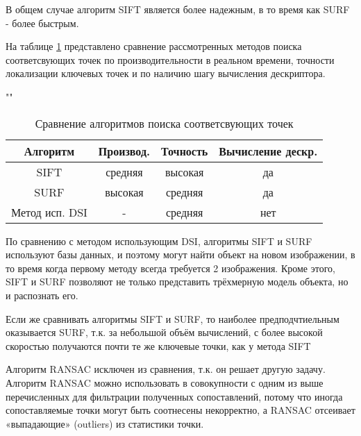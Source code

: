 В общем случае алгоритм SIFT является более надежным, в то время как SURF - более быстрым.

На таблице \ref{tab} представлено сравнение рассмотренных методов поиска соответсвующих точек по производительности в реальном времени, точности локализации ключевых точек и по наличию шагу вычисления дескриптора.

\begin{table}[H]
	\begin{center}
		\caption{Сравнение алгоритмов поиска соответсвующих точек}
		\label{tab}
		""\newline
		\begin{tabular}{ | c | c | c | c | }
			\hline
			Алгоритм & Производ.  & Точность & Вычисление дескр. \\ \hline
			SIFT & средняя & высокая & да \\ \hline
			SURF & высокая & средняя & да \\ \hline
			Метод исп. DSI & - & средняя & нет \\ \hline
		\end{tabular}
	\end{center}
\end{table}

По сравнению с методом использующим DSI, алгоритмы SIFT и SURF используют базы данных, и поэтому могут найти объект на новом изображении, в то время когда первому методу всегда требуется 2 изображения. Кроме этого, SIFT и SURF позволяют не только представить трёхмерную модель объекта, но и распознать его.

Если же сравнивать алгоритмы SIFT и SURF, то наиболее предподчтиельным оказывается SURF, т.к. за небольшой объём вычислений, с более высокой скоростью получаются почти те же ключевые точки, как у метода SIFT

Алгоритм RANSAC исключен из сравнения, т.к. он решает другую задачу. Алгоритм RANSAC можно использовать в совокупности с одним из выше перечисленных для фильтрации полученных сопоставлений, потому что иногда сопоставляемые точки могут быть соотнесены некорректно, а RANSAC отсеивает «выпадающие» (outliers) из статистики точки.

